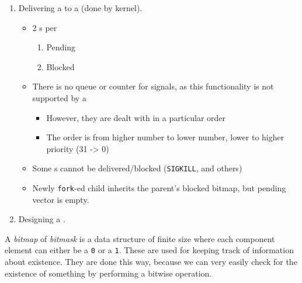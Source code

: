 \begin{enumerate}[noitemsep]
\item Delivering a  to a  (done by kernel).
  \begin{itemize}[noitemsep]
  \item 2 s per 
    \begin{enumerate}[noitemsep]
    \item Pending
    \item Blocked
    \end{enumerate}
  \item There is no queue or counter for signals, as this functionality is not supported by a 
    \begin{itemize}[noitemsep]
    \item However, they are dealt with in a particular order
    \item The order is from higher number to lower number, lower to higher priority (31 -> 0)
   \end{itemize}
  \item Some s cannot be delivered/blocked (\texttt{SIGKILL}, and others)
  \item Newly \texttt{fork}-ed child inherits the parent's blocked bitmap, but pending vector is empty.
  \end{itemize}

\item Designing a .
\end{enumerate}

\begin{definition}[Bitmap]\label{def:Bitmap}\label{def:Bitmask}
  A \emph{bitmap} of \emph{bitmask} is a data structure of finite size where each component element can either be a \texttt{0} or a \texttt{1}.
  These are used for keeping track of information about existence.
  They are done this way, because we can very easily check for the existence of something by performing a bitwise operation.
\end{definition}

